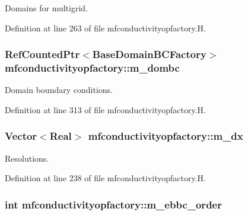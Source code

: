 Domains for multigrid. 



Definition at line 263 of file mfconductivityopfactory.\+H.

\subsubsection[{\texorpdfstring{m\+\_\+dombc}{m_dombc}}]{\setlength{\rightskip}{0pt plus 5cm}Ref\+Counted\+Ptr$<$Base\+Domain\+B\+C\+Factory$>$ mfconductivityopfactory\+::m\+\_\+dombc\hspace{0.3cm}{\ttfamily [protected]}}\hypertarget{classmfconductivityopfactory_ac4e5a7e33526139754aebda22170ab87}{}\label{classmfconductivityopfactory_ac4e5a7e33526139754aebda22170ab87}


Domain boundary conditions. 



Definition at line 313 of file mfconductivityopfactory.\+H.

\subsubsection[{\texorpdfstring{m\+\_\+dx}{m_dx}}]{\setlength{\rightskip}{0pt plus 5cm}Vector$<$Real$>$ mfconductivityopfactory\+::m\+\_\+dx\hspace{0.3cm}{\ttfamily [protected]}}\hypertarget{classmfconductivityopfactory_a994a318799e0fcc9e151a10c4e2de5df}{}\label{classmfconductivityopfactory_a994a318799e0fcc9e151a10c4e2de5df}


Resolutions. 



Definition at line 238 of file mfconductivityopfactory.\+H.

\subsubsection[{\texorpdfstring{m\+\_\+ebbc\+\_\+order}{m_ebbc_order}}]{\setlength{\rightskip}{0pt plus 5cm}int mfconductivityopfactory\+::m\+\_\+ebbc\+\_\+order\hspace{0.3cm}{\ttfamily [protected]}}\hypertarget{classmfconductivityopfactory_adbd54bd67fae0c06e8d5d1a0f92111bf}{}\label{classmfconductivityopfactory_adbd54bd67fae0c06e8d5d1a0f92111bf}


